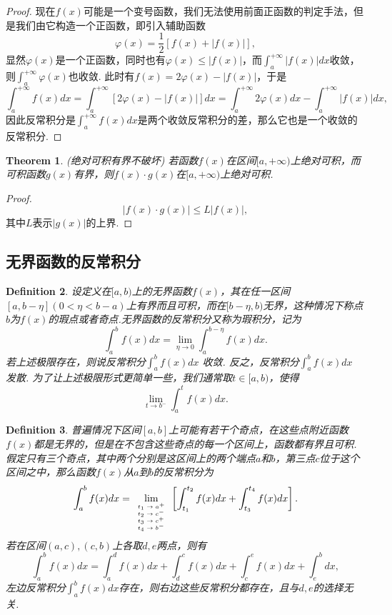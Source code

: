 \documentclass{article}
\newtheorem{theorem}{Theorem}[section]
\newtheorem{definition}[theorem]{Definition}
\begin{document}
\begin{proof}
{\color{blue}现在$f(x)$可能是一个变号函数，我们无法使用前面正函数的判定手法，但是我们由它构造一个正函数}，即引入辅助函数
$$
\varphi(x) = \frac{1}{2}\left[f(x) + |f(x)|\right],
$$
显然$\varphi(x)$是一个正函数，同时也有$\varphi(x) \leq |f(x)|$，而$\int_a^{+\infty} |f(x)|dx$收敛，则$\int_a^{+\infty} \varphi(x)$也收敛. 此时有$f(x) = 2\varphi(x) - |f(x)|$，于是
$$
\int_a^{+\infty} f(x)dx = \int_a^{+\infty} \left[2\varphi(x) - |f(x)| \right] dx=  \int_a^{+\infty} 2\varphi(x)dx - \int_a^{+\infty} |f(x)|dx,
$$ 
因此反常积分是$\int_a^{+\infty} f(x)dx$是两个收敛反常积分的差，那么它也是一个收敛的反常积分. 
\end{proof}

\begin{theorem}
\rm {\color{red} (绝对可积有界不破坏)} 若函数$f(x)$在区间$[a,+\infty)$上绝对可积，而可积函数$g(x)$有界，则$f(x)\cdot g(x)$在$[a,+\infty)$上绝对可积.
\end{theorem}

\begin{proof}
$$
|f(x)\cdot g(x)| \leq L|f(x)|,
$$
其中$L$表示$|g(x)|$的上界. 
\end{proof}

\subsection{无界函数的反常积分}


\begin{definition}
\rm 设定义在$[a,b)$上的无界函数$f(x)$，其在任一区间$[a,b-\eta](0 < \eta < b-a)$上有界而且可积，而在$[b-\eta,b)$无界，这种情况下称点$b$为$f(x)$的{\color{red}瑕点}或者{\color{red}奇点}.无界函数的反常积分又称为{\color{red}瑕积分}，记为
$$
\int_a^b f(x)dx = \lim\limits_{\eta \rightarrow 0} \int_a^{b-\eta} f(x)dx.
$$
若上述极限存在，则说反常积分$\int_a^b f(x)dx$ {\color{red}收敛}. 反之，反常积分$\int_a^b f(x)dx$ {\color{red}发散}. 为了让上述极限形式更简单一些，我们通常取$t \in [a,b)$，使得
$$
\lim\limits_{t \rightarrow b^{-}}\int_a^t f(x)dx.
$$
\end{definition}

\begin{definition}
\rm {\color{red}普遍情况下区间$[a,b]$上可能有若干个奇点}，在这些点附近函数$f(x)$都是无界的，但是在不包含这些奇点的每一个区间上，函数都有界且可积. 假定只有三个奇点，其中两个分别是这区间上的两个端点$a$和$b$，第三点$c$位于这个区间之中，那么函数$f(x)$从$a$到$b$的反常积分为
$$
\int_a^b f(x)dx = \lim\limits_{\mbox{\tiny$\begin{array}{ll}
t_1 \rightarrow	 a^+ \\
t_2 \rightarrow  c^- \\
t_3 \rightarrow  c^+ \\
t_4 \rightarrow  b^- \\
\end{array}$}} \left[ \int_{t_1}^{t_2}f(x)dx + \int_{t_3}^{t_4} f(x)dx \right].
$$
若在区间$(a,c),(c,b)$上各取$d,e$两点，则有
$$
\int_a^b f(x)dx  = \int_a^d f(x)dx + \int_d^c f(x)dx + \int_c^e f(x)dx + \int_e^b dx, 
$$
左边反常积分$\int_a^b f(x)dx$存在，则右边这些反常积分都存在，且与$d,e$的选择无关. 
\end{definition}
\end{document}
